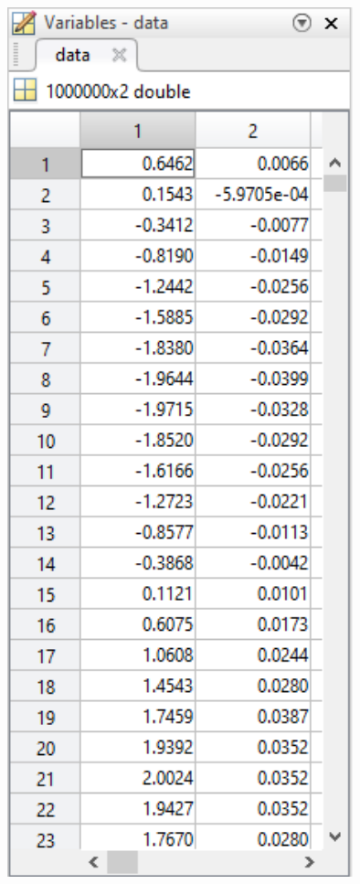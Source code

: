 \begin{figure}[H] 
\centering
{\includegraphics[width=10cm]
{Figure/modultestread6}}
\caption{}
\label{fig:modultestread6}
\end{figure}


